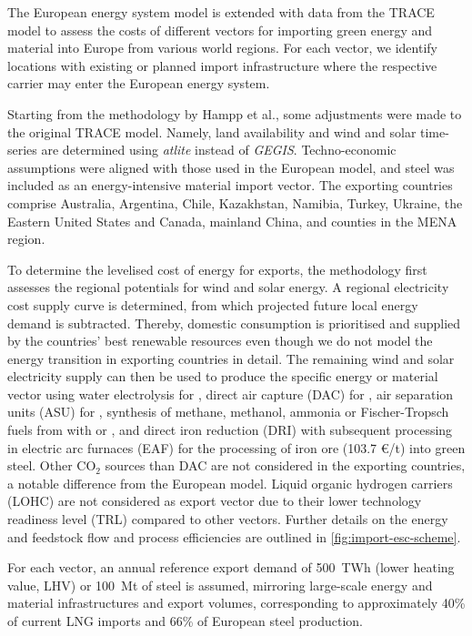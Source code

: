 \documentclass[5p,10pt]{elsarticle}
\begin{document}
The European energy system model is extended with data from the TRACE model
\cite{hamppImportOptions2023} to assess the costs of different vectors for
importing green energy and material into Europe from various world regions. For
each vector, we identify locations with existing or planned import
infrastructure where the respective carrier may enter the European energy
system.

Starting from the methodology by Hampp et al.\cite{hamppImportOptions2023}, some
adjustments were made to the original TRACE model. Namely, land availability and
wind and solar time-series are determined using
\textit{atlite}\cite{hofmannAtliteLightweight2021} instead of
\textit{GEGIS}.\cite{mattssonAutopilotEnergy2021} Techno-economic assumptions
were aligned with those used in the European model, and steel was included as an
energy-intensive material import vector. The exporting countries comprise
Australia, Argentina, Chile, Kazakhstan, Namibia, Turkey, Ukraine, the Eastern
United States and Canada, mainland China, and counties in the MENA region.

To determine the levelised cost of energy for exports, the methodology first
assesses the regional potentials for wind and solar energy. A regional
electricity cost supply curve is determined, from which projected future local
energy demand is subtracted. Thereby, domestic consumption is prioritised and
supplied by the countries' best renewable resources even though we do not model
the energy transition in exporting countries in detail. The remaining wind and
solar electricity supply can then be used to produce the specific energy or
material vector using water electrolysis for , direct air capture (DAC)
for , air separation units (ASU) for , synthesis of methane,
methanol, ammonia or Fischer-Tropsch fuels from  with  or
, and  direct iron reduction (DRI) with subsequent processing in
electric arc furnaces (EAF) for the processing of iron ore (103.7 \euro{}/t)
into green steel. Other CO$_2$ sources than DAC are not considered in the
exporting countries, a notable difference from the European model. Liquid
organic hydrogen carriers (LOHC) are not considered as export vector due to
their lower technology readiness level (TRL) compared to other
vectors.\cite{irenaGlobalHydrogen2022} Further details on the energy and
feedstock flow and process efficiencies are outlined in
\cref{fig:import-esc-scheme}.

For each vector, an annual reference export demand of 500~TWh (lower heating
value, LHV) or 100~Mt of steel is assumed, mirroring large-scale energy and
material infrastructures and export volumes, corresponding to approximately 40\%
of current LNG
imports\cite{instituteforenergyeconomicsandfinancialanalysisEuropeanLNG2023} and
66\% of European steel
production.\cite{eurofer-theeuropeansteelassociationEuropeanSteel2023}
\end{document}
